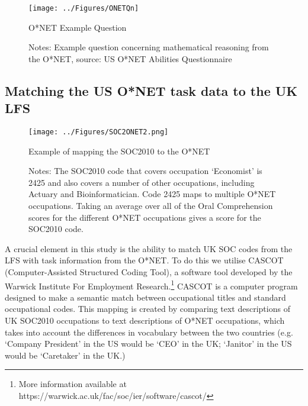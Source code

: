 \documentclass[12pt,authoryear]{elsarticle}
\begin{document}
	\begin{figure}[H]
		\centering
		\texttt{[image: ../Figures/ONETQn]}
		\caption{O*NET Example Question}
		\caption*{\footnotesize{Notes: Example question concerning mathematical reasoning from the O*NET, source: US O*NET Abilities Questionnaire}}
		\label{fig:ONETQn}
	\end{figure}
	

	
	
	
	
	
	
	\subsection{Matching the US O*NET task data to the UK LFS}
	\label{sec:matchLFSONET}
	
	\begin{figure}[t!]
		\begin{center}
			\texttt{[image: ../Figures/SOC2ONET2.png]}
			\caption{Example of mapping the SOC2010 to the O*NET }
			\caption*{\footnotesize{Notes: The SOC2010 code that covers occupation `Economist' is 2425 and also covers a number of other occupations, including Actuary and Bioinformatician. Code 2425 maps to multiple O*NET occupations. Taking an average over all of the Oral Comprehension scores for the different O*NET occupations gives a score for the SOC2010 code. }}
			\label{fig:SOC2ONET}
		\end{center}
	\end{figure}
	
	A crucial element in this study is the ability to match UK SOC codes from the LFS with task information from the O*NET. To do this we utilise CASCOT (Computer-Assisted Structured Coding Tool), a software tool developed by the Warwick Institute For Employment Research.\footnote{More information available at https://warwick.ac.uk/fac/soc/ier/software/cascot/} CASCOT is a computer program designed to make a semantic match between occupational titles and standard occupational codes. This mapping is created by comparing text descriptions of UK SOC2010 occupations to text descriptions of O*NET occupations, which takes into account the differences in vocabulary between the two countries (e.g. `Company President' in the US would be `CEO' in the UK; `Janitor' in the US would be `Caretaker' in the UK.)
	
	\vspace{2mm}
	
\end{document}

